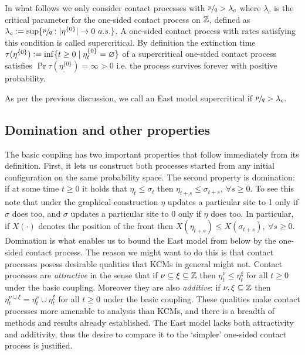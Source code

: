 In what follows we only consider contact processes with $\sfrac{p}{q} > \lambda_c$ where $\lambda_c$ is the critical parameter for the one-sided contact process on $\mathbb{Z}$, defined as $\lambda_c \vcentcolon= \sup\{ \sfrac{p}{q} : |\eta^{\{0\}}| \rightarrow 0\ a.s.\}$. A one-sided contact process with rates satisfying this condition is called supercritical. By definition the extinction time $\tau(\eta^{\{0\}}_.) \vcentcolon= \inf\{t \geq 0 \mid \eta^{\{0\}}_t = \varnothing \}$ of a supercritical one-sided contact process satisfies $\Pr{\tau(\eta^{\{0\}}_.) = \infty} > 0$ i.e. the process survives forever with positive probability. 

\begin{notation}
As per the previous discussion, we call an East model supercritical if $\sfrac{p}{q} > \lambda_c$. 
\end{notation}

\subsection{Domination and other properties}\label{ssec:intro_properties}
The basic coupling has two important properties that follow immediately from its definition. First, it lets us construct both processes started from any initial configuration on the same probability space. The second property is domination: if at some time $t \geq 0$ it holds that $\eta_t \leq \sigma_t$ then $\eta_{t+s} \leq \sigma_{t+s},\ \forall s \geq 0$. To see this note that under the graphical construction $\eta$ updates a particular site to 1 only if $\sigma$ does too, and $\sigma$ updates a particular site to 0 only if $\eta$ does too. In particular, if $X(\cdot)$ denotes the position of the front then $X(\eta_{t+s}) \leq X(\sigma_{t+s}),\ \forall s \geq 0$. \\

Domination is what enables us to bound the East model from below by the one-sided contact process. The reason we might want to do this is that contact processes posess desirable qualities that KCMs in general might not. Contact processes are \textit{attractive} in the sense that if $\nu \subseteq \xi \subseteq \mathbb{Z}$ then $\eta^\nu_t \leq \eta^\xi_t$ for all $t \geq 0$ under the basic coupling. Moreover they are also \textit{additive}: if $\nu, \xi \subseteq \mathbb{Z}$ then $\eta^{\nu \cup \xi}_t = \eta^\nu_t \cup \eta^\xi_t$ for all $t \geq 0$ under the basic coupling. These qualities make contact processes more amenable to analysis than KCMs, and there is a breadth of methods and results already established. The East model lacks both attractivity and additivity, thus the desire to compare it to the `simpler' one-sided contact process is justified. 
